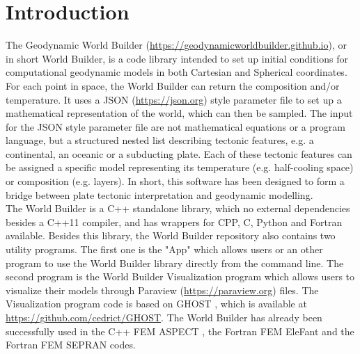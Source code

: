 \documentclass{book}
\newcommand{\GWB}{{Geodynamic World Builder}}
\newcommand{\WB}{{World Builder}}
\newcommand{\paraview}{{Paraview}}
\newcommand{\ghost}{{GHOST}}
\newcommand{\aspect}{{ASPECT}}
\newcommand{\elephant}{{EleFant}}
\newcommand{\sepran}{{SEPRAN}}
\begin{document}
\chapter{Introduction}
The \GWB{} (\url{https://geodynamicworldbuilder.github.io}), or in short \WB{}, is a code library intended to set up initial conditions for computational geodynamic models in both Cartesian and Spherical coordinates. For each point in space, the \WB{} can return the composition and/or temperature. It uses a JSON (\url{https://json.org}) style parameter file to set up a mathematical representation of the world, which can then be sampled. The input for the JSON style parameter file are not mathematical equations or a program language, but a structured nested list describing tectonic features, e.g. a continental, an oceanic or a subducting plate. Each of these tectonic features can be assigned a specific model representing its temperature (e.g. half-cooling space) or composition (e.g. layers). In short, this software has been designed to form a bridge between plate tectonic interpretation and geodynamic modelling.
\\
The \WB{} is a C++ standalone library, which no external dependencies besides a C++11 compiler, and has wrappers for CPP, C, Python and Fortran available. Besides this library, the \WB{} repository also contains two utility programs. The first one is the "App" which allows users or an other program to use the \WB{} library directly from the command line. The second program is the \WB{} Visualization program which allows users to visualize their models through \paraview{} (\url{https://paraview.org}) files. The Visualization program code is based on \ghost{} \citep{Thieulot_2018}, which is available at \url{https://github.com/cedrict/GHOST}. The \WB{} has already been successfully used in the C++ FEM \aspect{} \citep{KHB12,heister_aspect_methods2,aspect-doi-v2.0.1,aspectmanual}, the Fortran FEM \elephant{} \citep{Thieulot_2017} and the Fortran FEM \sepran \citep{vasy15} codes.
\end{document}
